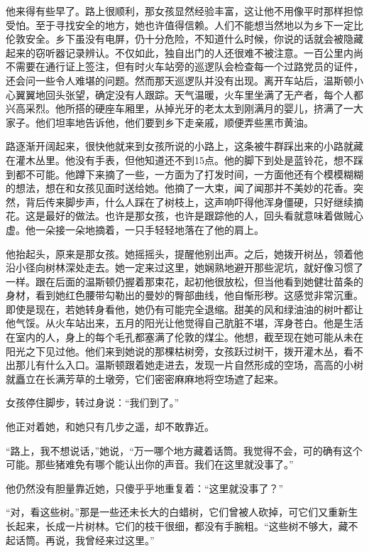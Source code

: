 他来得有些早了。路上很顺利，那女孩显然经验丰富，这让他不用像平时那样担惊受怕。至于寻找安全的地方，她也许值得信赖。人们不能想当然地以为乡下一定比伦敦安全。乡下虽没有电屏，仍十分危险，不知道什么时候，你说的话就会被隐藏起来的窃听器记录辨认。不仅如此，独自出门的人还很难不被注意。一百公里内尚不需要在通行证上签注，但有时火车站旁的巡逻队会检查每一个过路党员的证件，还会问一些令人难堪的问题。然而那天巡逻队并没有出现。离开车站后，温斯顿小心翼翼地回头张望，确定没有人跟踪。天气温暖，火车里坐满了无产者，每个人都兴高采烈。他所搭的硬座车厢里，从掉光牙的老太太到刚满月的婴儿，挤满了一大家子。他们坦率地告诉他，他们要到乡下走亲戚，顺便弄些黑市黄油。

路逐渐开阔起来，很快他就来到女孩所说的小路上，这条被牛群踩出来的小路就藏在灌木丛里。他没有手表，但他知道还不到15点。他的脚下到处是蓝铃花，想不踩到都不可能。他蹲下来摘了一些，一方面为了打发时间，一方面他还有个模模糊糊的想法，想在和女孩见面时送给她。他摘了一大束，闻了闻那并不美妙的花香。突然，背后传来脚步声，什么人踩在了树枝上，这声响吓得他浑身僵硬，只好继续摘花。这是最好的做法。也许是那女孩，也许是跟踪他的人，回头看就意味着做贼心虚。他一朵接一朵地摘着，一只手轻轻地落在了他的肩上。

他抬起头，原来是那女孩。她摇摇头，提醒他别出声。之后，她拨开树丛，领着他沿小径向树林深处走去。她一定来过这里，她娴熟地避开那些泥坑，就好像习惯了一样。跟在后面的温斯顿仍握着那束花，起初他很放松，但当他看到她健壮苗条的身材，看到她红色腰带勾勒出的曼妙的臀部曲线，他自惭形秽。这感觉非常沉重。即使是现在，若她转身看他，她仍有可能完全退缩。甜美的风和绿油油的树叶都让他气馁。从火车站出来，五月的阳光让他觉得自己肮脏不堪，浑身苍白。他是生活在室内的人，身上的每个毛孔都塞满了伦敦的煤尘。他想，截至现在她可能从未在阳光之下见过他。他们来到她说的那棵枯树旁，女孩跃过树干，拨开灌木丛，看不出那儿有什么入口。温斯顿跟着她走进去，发现一片自然形成的空场，高高的小树就矗立在长满芳草的土墩旁，它们密密麻麻地将空场遮了起来。

女孩停住脚步，转过身说：``我们到了。''

他正对着她，和她只有几步之遥，却不敢靠近。

``路上，我不想说话，''她说，``万一哪个地方藏着话筒。我觉得不会，可的确有这个可能。那些猪难免有哪个能认出你的声音。我们在这里就没事了。''

他仍然没有胆量靠近她，只傻乎乎地重复着：``这里就没事了？''

``对，看这些树。''那是一些还未长大的白蜡树，它们曾被人砍掉，可它们又重新生长起来，长成一片树林。它们的枝干很细，都没有手腕粗。``这些树不够大，藏不起话筒。再说，我曾经来过这里。''

